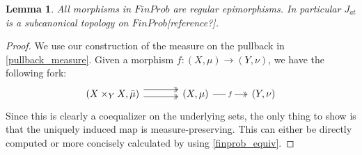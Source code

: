 \documentclass[a4paper]{amsproc}
\theoremstyle{plain}
\newtheorem{theorem}{Theorem}[section]
\newtheorem{lemma}[theorem]{Lemma}
\theoremstyle{definition}
\theoremstyle{remark}
\numberwithin{equation}{section}
\begin{document}
\begin{lemma}\label{subcanonical} All morphisms in $FinProb$ are regular epimorphisms. In particular $J_{at}$ is a subcanonical topology on $FinProb$[reference?].
\end{lemma}
\begin{proof}
We use our construction of the measure on the pullback in \ref{pullback_measure}. Given a morphism $f:(X,\mu)\rightarrow (Y, \nu)$, we have the following fork:
\[
\begin{tikzcd}[column sep=large]
(X \times_Y X, \bar{\mu}) \arrow[r, two heads, shift left=2] \arrow[r, two heads, shift right] & (X,\mu) \arrow[r, "f" description, two heads] & (Y,\nu)
\end{tikzcd}
\]
Since this is clearly a coequalizer on the underlying sets, the only thing to show is that the uniquely induced map is measure-preserving. This can either be directly computed or more concisely calculated by using \ref{finprob_equiv}.
\end{proof}
\end{document}
